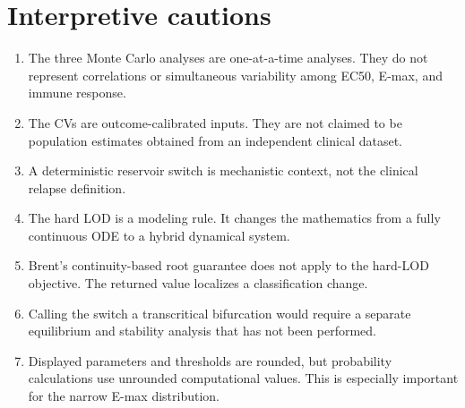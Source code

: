 \documentclass[11pt]{article}
\begin{document}
\section{Interpretive cautions}

\begin{enumerate}
\item The three Monte Carlo analyses are one-at-a-time analyses. They do not
represent correlations or simultaneous variability among EC50, E-max, and
immune response.
\item The CVs are outcome-calibrated inputs. They are not claimed to be
population estimates obtained from an independent clinical dataset.
\item A deterministic reservoir switch is mechanistic context, not the
clinical relapse definition.
\item The hard LOD is a modeling rule. It changes the mathematics from a
fully continuous ODE to a hybrid dynamical system.
\item Brent's continuity-based root guarantee does not apply to the
hard-LOD objective. The returned value localizes a classification change.
\item Calling the switch a transcritical bifurcation would require a separate
equilibrium and stability analysis that has not been performed.
\item Displayed parameters and thresholds are rounded, but probability
calculations use unrounded computational values. This is especially important
for the narrow E-max distribution.
\end{enumerate}



\end{document}
